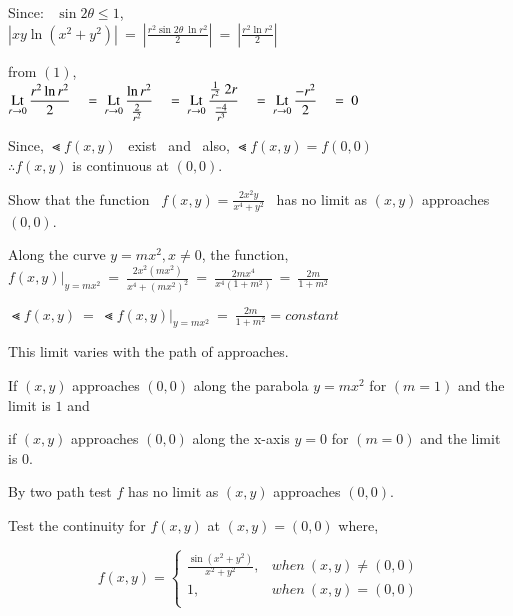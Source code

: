 \documentclass[12pt]{article}
\begin{document}
\vspace{2ex}
Since: \ $\sin{2\theta \leq 1}$,\\
$\left|xy \ln{(x^2+y^2)}\right| \ = \ \left|\frac{r^2 \sin{2\theta}\ \ln{r^2}}{2}\right| \ = \ \left|\frac{r^2 \ln{r^2}}{2}\right|$

\vspace{2ex}
from $(1)$,\\
$\begin{aligned}
   \Lt[0][r] \frac{r^2 \ln{r^2}}{2} \quad = \
   \Lt[0][r] \frac{\ln{r^2}}{\scalebox{1}{$\frac{2}{r^2}$}}   \quad = \
   \Lt[0][r] \frac{\scalebox{1}{$\frac{1}{r^2}$} 
   \ 2r}{\scalebox{1}{$\frac{-4}{r^3}$}} \quad = \
   \Lt[0][r] \frac{-r^2}{2} \quad = \ 0
\end{aligned}$


\vspace{3ex}
Since, $\Lt f(x, y)$ \ exist \ and \ also, $\Lt f(x, y) = f(0,0)$\\[1ex]
$\therefore f(x,y)$ is continuous at $(0,0)$.

\vspace{5ex}
\textbf{} Show that the function \ $f(x,y) = \frac{2x^2y}{x^4+y^2}$ \ has
no limit as $(x,y)$ approaches $(0,0)$.


Along the curve $y=mx^2, x\neq 0$, the function,\\[1ex]
$f(x,y)|_{y=mx^2}
\ = \ \frac{2x^2(mx^2)}{x^4+(mx^2)^2}
\ = \ \frac{2mx^4}{x^4(1+m^2)}
\ = \ \frac{2m}{1+m^2}$

\vspace{3ex}
$\Lt f(x,y) \ = \ \Lt f(x,y)|_{y=mx^2}
\ = \ \frac{2m}{1+m^2} = constant$

\vspace{3ex}
This limit  varies with the path of approaches.

If $(x,y)$ approaches $(0,0)$ along the parabola $y=mx^2$ for $(m=1)$ and the limit is $1$ and

if $(x,y)$ approaches $(0,0)$ along the x-axis $y=0$ for $(m=0)$ and the limit is $0$.

By two path test $f$ has no limit as $(x,y)$ approaches $(0,0)$.



\pagebreak
\textbf{} Test the continuity for $f(x,y)$ at $(x,y)=(0,0)$ where,

\vspace{-0.5\baselineskip}
\begin{equation*}
   f(x,y) =
   \begin{cases}
      \frac{\sin{(x^2+y^2)}}{x^2+y^2}, & when \ (x,y) \neq (0,0)\\
           1, & when \ (x,y) = (0,0)\\
   \end{cases}
\end{equation*}
\end{document}
